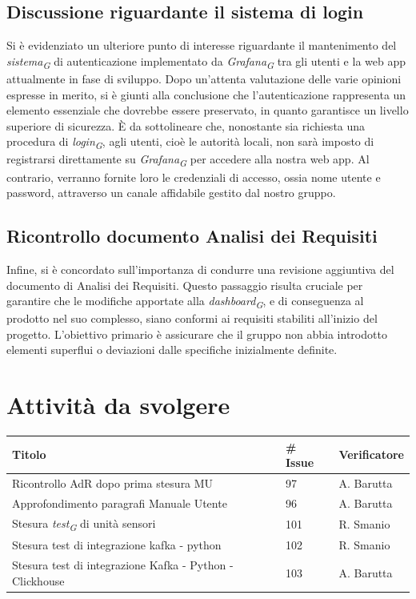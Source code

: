\documentclass{article}
\begin{document}
    \subsection{Discussione riguardante il sistema di login}
    Si è evidenziato un ulteriore punto di interesse riguardante il mantenimento del \textit{sistema}\textsubscript{\textit{G}} di autenticazione implementato da \textit{Grafana}\textsubscript{\textit{G}} tra gli utenti e la web app attualmente in fase di sviluppo. Dopo un'attenta valutazione delle varie opinioni espresse in merito, si è giunti alla conclusione che l'autenticazione rappresenta un elemento essenziale che dovrebbe essere preservato, in quanto garantisce un livello superiore di sicurezza. È da sottolineare che, nonostante sia richiesta una procedura di \textit{login}\textsubscript{\textit{G}}, agli utenti, cioè le autorità locali, non sarà imposto di registrarsi direttamente su \textit{Grafana}\textsubscript{\textit{G}} per accedere alla nostra web app. Al contrario, verranno fornite loro le credenziali di accesso, ossia nome utente e password, attraverso un canale affidabile gestito dal nostro gruppo.
    \subsection{Ricontrollo documento Analisi dei Requisiti}
    Infine, si è concordato sull'importanza di condurre una revisione aggiuntiva del documento di Analisi dei Requisiti. Questo passaggio risulta cruciale per garantire che le modifiche apportate alla \textit{dashboard}\textsubscript{\textit{G}}, e di conseguenza al prodotto nel suo complesso, siano conformi ai requisiti stabiliti all'inizio del progetto. L'obiettivo primario è assicurare che il gruppo non abbia introdotto elementi superflui o deviazioni dalle specifiche inizialmente definite.

    \section{Attività da svolgere}
    \begin{center}
        \begin{tabular}{|C{7cm}|C{1,5cm}|C{3cm}|}
            \hline
            \textbf{Titolo} & \textbf{\# Issue} & \textbf{Verificatore} \\
            \hline\hline
            Ricontrollo AdR dopo prima stesura MU & 97 & A. Barutta \\
            \hline
            Approfondimento paragrafi Manuale Utente & 96 & A. Barutta \\
            \hline
            Stesura \textit{test}\textsubscript{\textit{G}} di unità sensori & 101 & R. Smanio \\
            \hline
            Stesura test di integrazione kafka - python & 102 & R. Smanio \\
            \hline
            Stesura test di integrazione Kafka - Python - Clickhouse & 103 & A. Barutta \\
            \hline
        \end{tabular}
    \end{center}
\end{document}
